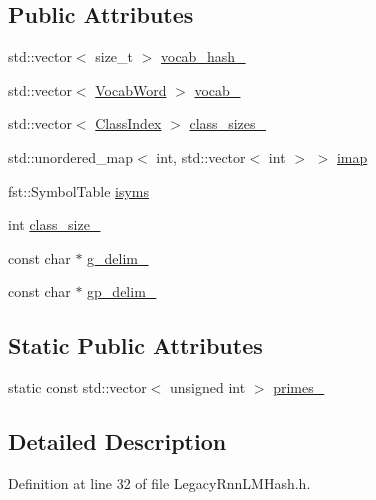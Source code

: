 \subsection*{Public Attributes}
\begin{DoxyCompactItemize}
\item 
std\+::vector$<$ size\+\_\+t $>$ \hyperlink{class_legacy_rnn_l_m_hash_aee87a3acc4cfc872c9e284af3599149c}{vocab\+\_\+hash\+\_\+}
\item 
std\+::vector$<$ \hyperlink{struct_vocab_word}{Vocab\+Word} $>$ \hyperlink{class_legacy_rnn_l_m_hash_ac3d37fb87e5a699ecba7549f65aec880}{vocab\+\_\+}
\item 
std\+::vector$<$ \hyperlink{struct_class_index}{Class\+Index} $>$ \hyperlink{class_legacy_rnn_l_m_hash_aa2976192716a5c8f289f3c9fe19f79ed}{class\+\_\+sizes\+\_\+}
\item 
std\+::unordered\+\_\+map$<$ int, std\+::vector$<$ int $>$ $>$ \hyperlink{class_legacy_rnn_l_m_hash_acfb8a7033158a75c62ceec1c06b44821}{imap}
\item 
fst\+::\+Symbol\+Table \hyperlink{class_legacy_rnn_l_m_hash_aae1c188827296cc340a68e100dc95695}{isyms}
\item 
int \hyperlink{class_legacy_rnn_l_m_hash_a32c4220e66eab108d7d92a91d41e75bb}{class\+\_\+size\+\_\+}
\item 
const char $\ast$ \hyperlink{class_legacy_rnn_l_m_hash_a0921a7ba3bae2b5fd9bb8c5a5dae987b}{g\+\_\+delim\+\_\+}
\item 
const char $\ast$ \hyperlink{class_legacy_rnn_l_m_hash_aa0df8057995fb6758849910fb5d0c1e2}{gp\+\_\+delim\+\_\+}
\end{DoxyCompactItemize}
\subsection*{Static Public Attributes}
\begin{DoxyCompactItemize}
\item 
static const std\+::vector$<$ unsigned int $>$ \hyperlink{class_legacy_rnn_l_m_hash_aab92e8f544bba90a0709f094c24d46dc}{primes\+\_\+}
\end{DoxyCompactItemize}


\subsection{Detailed Description}


Definition at line 32 of file Legacy\+Rnn\+L\+M\+Hash.\+h.



